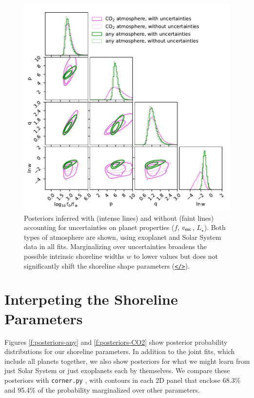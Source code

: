\documentclass[modern,linenumbers,trackchanges]{aastex7}
\begin{document}
\begin{figure}[ht!]
\includegraphics[width=\textwidth]{figures/posteriors-with-and-without-uncertainties.pdf}

\caption{Posteriors inferred with (intense lines) and without (faint lines) accounting for uncertainties on planet properties ($f$, $v_{\sf esc}$, $L_\star$). Both types of atmosphere are shown, using exoplanet and Solar System data in all fits. Marginalizing over uncertainties broadens the possible intrinsic shoreline widths $w$ to lower values but does not significantly shift the shoreline shape parameters (\href{https://github.com/zkbt/shoreline/blob/main/notebooks/print-and-visualize-posteriors.ipynb}{\texttt{</>}}).}
\label{f:posteriors-uncertainties}
\end{figure}


\section{Interpeting the Shoreline Parameters}
\label{s:slopes}

Figures \ref{f:posteriors-any} and  \ref{f:posteriors-CO2} show posterior probability distributions for our shoreline parameters. In addition to the joint fits, which include all planets together, we also show posteriors for what we might learn from just Solar System or just exoplanets each by themselves. We compare these posteriors with \texttt{corner.py} \citep{foreman-mackeyCornerpyScatterplotMatrices2016}, with contours in each 2D panel that enclose 68.3\% and 95.4\% of the probability marginalized over other parameters. 
\end{document}
